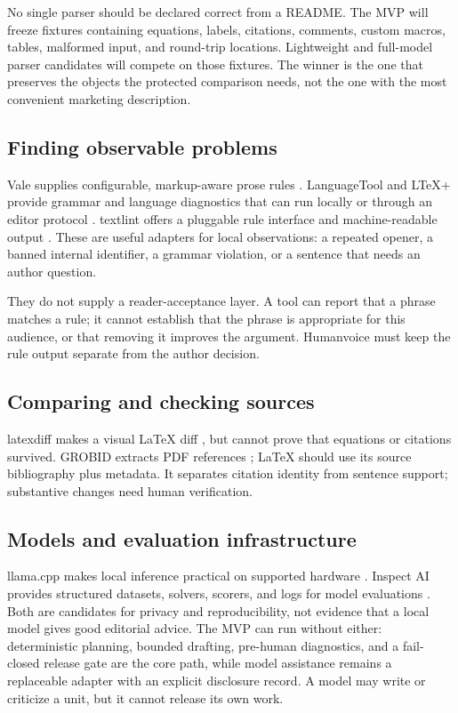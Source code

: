 No single parser should be declared correct from a README. The MVP will freeze
fixtures containing equations, labels, citations, comments, custom macros,
tables, malformed input, and round-trip locations. Lightweight and full-model
parser candidates will compete on those fixtures. The winner is the one that preserves the objects the
protected comparison needs, not the one with the most convenient marketing
description.

\subsection{Finding observable problems}

Vale supplies configurable, markup-aware prose rules
\citep{vale2026docs}. LanguageTool and LTeX+ provide grammar and language
diagnostics that can run locally or through an editor protocol
\citep{languagetool2026dev,ltexplus2026}. textlint offers a pluggable rule
interface and machine-readable output \citep{textlint2026docs}. These are useful adapters for local
observations: a repeated opener, a banned internal identifier, a grammar
violation, or a sentence that needs an author question.

They do not supply a reader-acceptance layer. A tool can report that a phrase
matches a rule; it cannot establish that the phrase is appropriate for this
audience, or that removing it improves the argument. Humanvoice must keep the
rule output separate from the author decision.

\subsection{Comparing and checking sources}

latexdiff makes a visual LaTeX diff \citep{latexdiff2026}, but cannot prove
that equations or citations survived. GROBID extracts PDF references
\citep{grobid2026}; LaTeX should use its source bibliography plus metadata. It
separates citation identity from sentence support; substantive changes need
human verification.

\subsection{Models and evaluation infrastructure}

llama.cpp makes local inference practical on supported hardware
\citep{llamacpp2026}. Inspect AI provides structured datasets, solvers, scorers,
and logs for model evaluations \citep{inspectai2026}. Both are candidates for
privacy and reproducibility, not evidence that a local model gives good
editorial advice. The MVP can run without either: deterministic planning,
bounded drafting, pre-human diagnostics, and a fail-closed release gate are the
core path, while model assistance remains a replaceable adapter with an explicit
disclosure record. A model may write or criticize a unit, but it cannot release
its own work.


